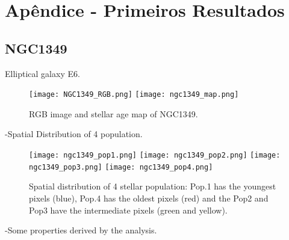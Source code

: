 \chapter{Ap\^endice - Primeiros Resultados}
\label{apendice01}

\newpage
\section*{NGC1349}
Elliptical galaxy E6.


\begin{figure}[bh]
\begin{center}
\texttt{[image: NGC1349\_RGB.png]}
\texttt{[image: ngc1349\_map.png]}
 \caption{RGB image and stellar age map of NGC1349.}
   \label{fig1}
\end{center}
\end{figure}

-Spatial Distribution of 4 population.

\begin{figure}[bh]
\begin{center}
\texttt{[image: ngc1349\_pop1.png]}
\texttt{[image: ngc1349\_pop2.png]}
\texttt{[image: ngc1349\_pop3.png]}
\texttt{[image: ngc1349\_pop4.png]}
 \caption{Spatial distribution of 4 stellar population: Pop.1 has the youngest pixels (blue), Pop.4 has the oldest pixels (red) and the Pop2 and Pop3 have the intermediate pixels (green and yellow).}
   \label{fig1}
\end{center}
\end{figure}

-Some properties derived by the analysis.

